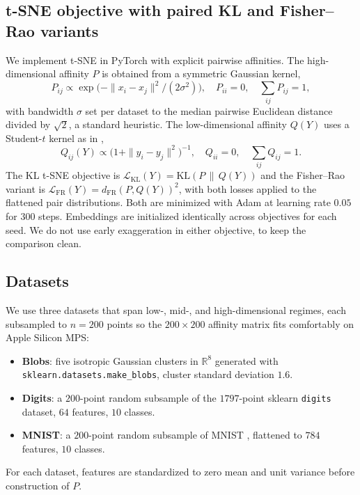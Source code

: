 \documentclass[11pt]{article}
\begin{document}
\subsection{t-SNE objective with paired KL and Fisher--Rao variants}

We implement t-SNE in PyTorch with explicit pairwise affinities. The high-dimensional affinity
$P$ is obtained from a symmetric Gaussian kernel,
\begin{equation}
  P_{ij} \propto \exp\!\big(-\|x_i - x_j\|^2 / (2\sigma^2)\big),\quad P_{ii}=0,\quad \textstyle\sum_{ij} P_{ij}=1,
\end{equation}
with bandwidth $\sigma$ set per dataset to the median pairwise Euclidean distance divided by
$\sqrt{2}$, a standard heuristic. The low-dimensional affinity $Q(Y)$ uses a Student-$t$
kernel as in \citet{maaten2008visualizing},
\begin{equation}
  Q_{ij}(Y) \propto \big(1+\|y_i - y_j\|^2\big)^{-1},\quad Q_{ii}=0,\quad \textstyle\sum_{ij} Q_{ij}=1.
\end{equation}
The KL t-SNE objective is $\mathcal{L}_{\mathrm{KL}}(Y) = \mathrm{KL}(P\,\|\,Q(Y))$ and the
Fisher--Rao variant is $\mathcal{L}_{\mathrm{FR}}(Y) = d_{\mathrm{FR}}(P, Q(Y))^2$, with both
losses applied to the flattened pair distributions. Both are minimized with Adam at learning
rate $0.05$ for $300$ steps. Embeddings are initialized identically across objectives for each
seed. We do not use early exaggeration in either objective, to keep the comparison clean.

\subsection{Datasets}
\label{sec:datasets}

We use three datasets that span low-, mid-, and high-dimensional regimes, each subsampled to
$n=200$ points so the $200{\times}200$ affinity matrix fits comfortably on Apple Silicon MPS:
\begin{itemize}
  \item \textbf{Blobs}: five isotropic Gaussian clusters in $\mathbb{R}^8$ generated with
        \texttt{sklearn.datasets.make\_blobs}, cluster standard deviation $1.6$.
  \item \textbf{Digits}: a $200$-point random subsample of the $1797$-point sklearn
        \texttt{digits} dataset, $64$ features, $10$ classes.
  \item \textbf{MNIST}: a $200$-point random subsample of MNIST \citep{lecun1998gradient},
        flattened to $784$ features, $10$ classes.
\end{itemize}
For each dataset, features are standardized to zero mean and unit variance before construction
of $P$.
\end{document}
